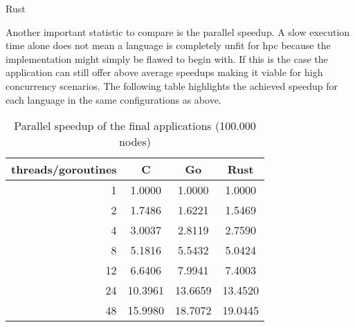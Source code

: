 Rust

Another important statistic to compare is the parallel speedup. A slow execution time alone does not mean a language is completely unfit for \gls{hpc} because the implementation might simply be flawed to begin with. If this is the case the application can still offer above average speedups making it viable for high concurrency scenarios. The following table highlights the achieved speedup for each language in the same configurations as above.

\begin{table}[htb]
    \centering
    \begin{tabular}{rccc}
        \toprule
            threads/goroutines
            & C
            & Go
            & Rust \\
        \midrule

            1
            & \hspace{6pt}1.0000
            & \hspace{6pt}1.0000
            & \hspace{6pt}1.0000 \\

            2
            & \hspace{6pt}1.7486
            & \hspace{6pt}1.6221
            & \hspace{6pt}1.5469 \\

            4
            & \hspace{6pt}3.0037
            & \hspace{6pt}2.8119
            & \hspace{6pt}2.7590 \\

            8
            & \hspace{6pt}5.1816
            & \hspace{6pt}5.5432
            & \hspace{6pt}5.0424 \\

            12
            & \hspace{6pt}6.6406
            & \hspace{6pt}7.9941
            & \hspace{6pt}7.4003 \\

            24
            & 10.3961
            & 13.6659
            & 13.4520 \\

            48
            & 15.9980
            & 18.7072
            & 19.0445 \\

        \bottomrule
    \end{tabular}
    \caption{Parallel speedup of the final applications (100.000 nodes)}
    \label{tb:final_speedup}
\end{table}

